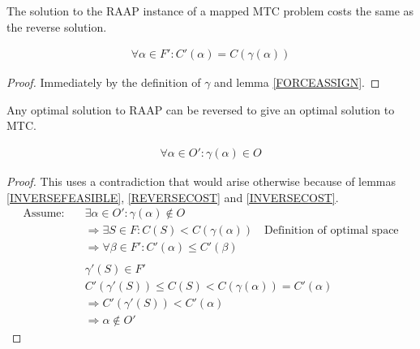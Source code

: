 \documentclass{article}
\begin{document}
\begin{lemma}
\label{REVERSECOST}
The solution to the RAAP instance of a mapped MTC problem costs the same as the reverse solution.

\begin{align}
	\nonumber \forall \alpha \in F' : C'(\alpha) = C(\gamma(\alpha))
\end{align}
\end{lemma}
\begin{proof}
Immediately by the definition of $\gamma$ and lemma \ref{FORCEASSIGN}.
\end{proof}

\begin{lemma}
\label{REVERSEOPTIMAL}
Any optimal solution to RAAP can be reversed to give an optimal solution to MTC.

\begin{align}
	\nonumber \forall \alpha \in O' : \gamma(\alpha) \in O
\end{align}
\end{lemma}
\begin{proof}
This uses a contradiction that would arise otherwise because of lemmas \ref{INVERSEFEASIBLE}, \ref{REVERSECOST} and \ref{INVERSECOST}.
\begin{align}
	\nonumber \mbox{Assume:} \quad & \exists \alpha \in O' : \gamma(\alpha) \not\in O \\
	\nonumber & \Rightarrow \exists S \in F : C(S) < C(\gamma(\alpha)) \quad \mbox{Definition of optimal space} \\
	\nonumber & \Rightarrow \forall \beta \in F' : C'(\alpha) \leq C'(\beta) \\
	\nonumber \\
	\nonumber & \gamma'(S) \in F' \\
	\nonumber & C'(\gamma'(S)) \leq C(S) < C(\gamma(\alpha)) = C'(\alpha) \\
	\nonumber & \Rightarrow C'(\gamma'(S)) < C'(\alpha) \\
	\nonumber & \Rightarrow \alpha \not\in O'
\end{align}
\end{proof}



\end{document}
